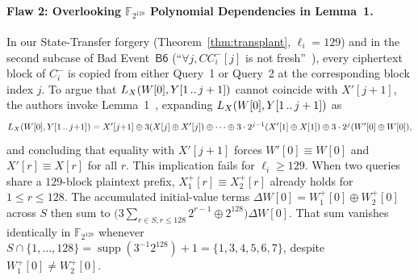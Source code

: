 \documentclass[11pt,a4paper]{article}
\theoremstyle{definition}
\theoremstyle{remark}
\newcommand{\FtwoN}{\mathbb{F}_{2^{128}}}
\newcommand{\supp}{\operatorname{supp}}
\begin{document}
\paragraph{Flaw 2: Overlooking $\FtwoN$ Polynomial Dependencies in Lemma~1.}
In our State-Transfer forgery (Theorem~\ref{thm:transplant}, $\ell_i = 129$) and in the second subcase of Bad Event~$\mathsf{B6}$ (``$\forall j, CC_i^-[j]$ is not fresh''~\cite[p.~23]{COLM24}), every ciphertext block of $C_i^-$ is copied from either Query~1 or Query~2 at the corresponding block index $j$. To argue that $L_X(W[0], Y[1 \mathinner{..} j+1])$ cannot coincide with $X'[j+1]$, the authors invoke Lemma~1~\cite[p.~20]{COLM24}, expanding $L_X(W[0], Y[1 \mathinner{..} j+1])$ as
\begin{equation}
L_X(W[0], Y[1 \mathinner{..} j{+}1]) = X'[j{+}1] \oplus 3(X[j] \oplus X'[j]) \oplus \dots \oplus 3 \cdot 2^{j-1}(X'[1] \oplus X[1]) \oplus 3 \cdot 2^j(W'[0] \oplus W[0]),
\end{equation}
and concluding that equality with $X'[j+1]$ forces $W'[0] \equiv W[0]$ and $X'[r] \equiv X[r]$ for all $r$. This implication fails for $\ell_i \ge 129$. When two queries share a $129$-block plaintext prefix, $X_1^+[r] \equiv X_2^+[r]$ already holds for $1 \le r \le 128$. The accumulated initial-value terms $\Delta W[0] = W_1^+[0] \oplus W_2^+[0]$ across $S$ then sum to $\big(3 \sum_{r \in S, r \le 128} 2^{r-1} \oplus 2^{128}\big) \Delta W[0]$. That sum vanishes identically in $\FtwoN$ whenever $S \cap \{1, \dots, 128\} = \supp(3^{-1} 2^{128}) + 1 = \{1, 3, 4, 5, 6, 7\}$, despite $W_1^+[0] \neq W_2^+[0]$.
\end{document}
